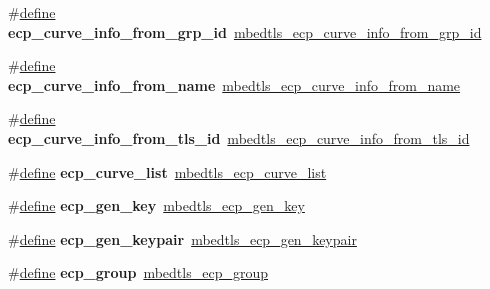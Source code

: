 \begin{DoxyCompactItemize}
\item 
\mbox{\label{compat-1_83_8h_a34701ab3d08b5a1f81cd3bd3cf7e499a}} 
\#\hyperlink{structdefine}{define} {\bfseries ecp\+\_\+curve\+\_\+info\+\_\+from\+\_\+grp\+\_\+id}~\hyperlink{ecp_8h_a6234c72d1af65d804da31a2706ef522e}{mbedtls\+\_\+ecp\+\_\+curve\+\_\+info\+\_\+from\+\_\+grp\+\_\+id}
\item 
\mbox{\label{compat-1_83_8h_ac84855ce9e0e07dd419110658270ee93}} 
\#\hyperlink{structdefine}{define} {\bfseries ecp\+\_\+curve\+\_\+info\+\_\+from\+\_\+name}~\hyperlink{ecp_8h_a961d3dd5f6c4938054c8f931f2a4ecdc}{mbedtls\+\_\+ecp\+\_\+curve\+\_\+info\+\_\+from\+\_\+name}
\item 
\mbox{\label{compat-1_83_8h_a2a1bf9e9ee1ee4156ca022a0cfdd6c3a}} 
\#\hyperlink{structdefine}{define} {\bfseries ecp\+\_\+curve\+\_\+info\+\_\+from\+\_\+tls\+\_\+id}~\hyperlink{ecp_8h_aac1e9b4f0112b88fbbc26776c5268c19}{mbedtls\+\_\+ecp\+\_\+curve\+\_\+info\+\_\+from\+\_\+tls\+\_\+id}
\item 
\mbox{\label{compat-1_83_8h_a1dec2f63d0741df5842df04852867ea2}} 
\#\hyperlink{structdefine}{define} {\bfseries ecp\+\_\+curve\+\_\+list}~\hyperlink{ecp_8h_aee4af7c7ad70564c44ba750cd96ae989}{mbedtls\+\_\+ecp\+\_\+curve\+\_\+list}
\item 
\mbox{\label{compat-1_83_8h_a40684edbe509bb1423fbacd7e8ecd08e}} 
\#\hyperlink{structdefine}{define} {\bfseries ecp\+\_\+gen\+\_\+key}~\hyperlink{ecp_8h_a0c9a407214f019493ba5d7bc27fa57dc}{mbedtls\+\_\+ecp\+\_\+gen\+\_\+key}
\item 
\mbox{\label{compat-1_83_8h_ac04799d8b5695cc776d9f38734041114}} 
\#\hyperlink{structdefine}{define} {\bfseries ecp\+\_\+gen\+\_\+keypair}~\hyperlink{ecp_8h_aa7d8987918be4f337102afacf7203d0d}{mbedtls\+\_\+ecp\+\_\+gen\+\_\+keypair}
\item 
\mbox{\label{compat-1_83_8h_a92d640b179a338d21cd881048928b6ce}} 
\#\hyperlink{structdefine}{define} {\bfseries ecp\+\_\+group}~\hyperlink{structmbedtls__ecp__group}{mbedtls\+\_\+ecp\+\_\+group}
\item 
\mbox{\label{compat-1_83_8h_a905ddf545ecf244c94a0e466615537fd}} 

\end{DoxyCompactItemize}
